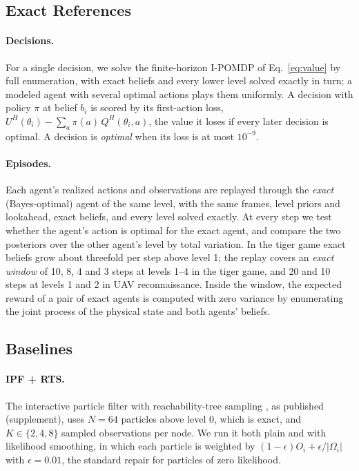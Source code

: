 \documentclass{article}
\begin{document}
\subsection{Exact References}

\paragraph{Decisions.} For a single decision, we solve the finite-horizon I-POMDP of Eq.~\ref{eq:value} by full enumeration, with exact beliefs and every lower level solved exactly in turn; a modeled agent with several optimal actions plays them uniformly. A decision with policy $\pi$ at belief $b_i$ is scored by its first-action loss, $U^H(\theta_i) - \sum_{a} \pi(a)\, Q^H(\theta_i, a)$, the value it loses if every later decision is optimal. A decision is \emph{optimal} when its loss is at most $10^{-9}$.

\paragraph{Episodes.} Each agent's realized actions and observations are replayed through the \emph{exact} (Bayes-optimal) agent of the same level, with the same frames, level priors and lookahead, exact beliefs, and every level solved exactly. At every step we test whether the agent's action is optimal for the exact agent, and compare the two posteriors over the other agent's level by total variation. In the tiger game exact beliefs grow about threefold per step above level 1; the replay covers an \emph{exact window} of 10, 8, 4 and 3 steps at levels 1--4 in the tiger game, and 20 and 10 steps at levels 1 and 2 in UAV reconnaissance. Inside the window, the expected reward of a pair of exact agents is computed with zero variance by enumerating the joint process of the physical state and both agents' beliefs.

\subsection{Baselines}

\paragraph{IPF + RTS.} The interactive particle filter with reachability-tree sampling \cite{doshi2009monte}, as published (supplement), uses $N = 64$ particles above level 0, which is exact, and $K \in \{2, 4, 8\}$ sampled observations per node. We run it both plain and with likelihood smoothing, in which each particle is weighted by $(1-\epsilon) O_i + \epsilon / |\Omega_i|$ with $\epsilon = 0.01$, the standard repair for particles of zero likelihood.
\end{document}
